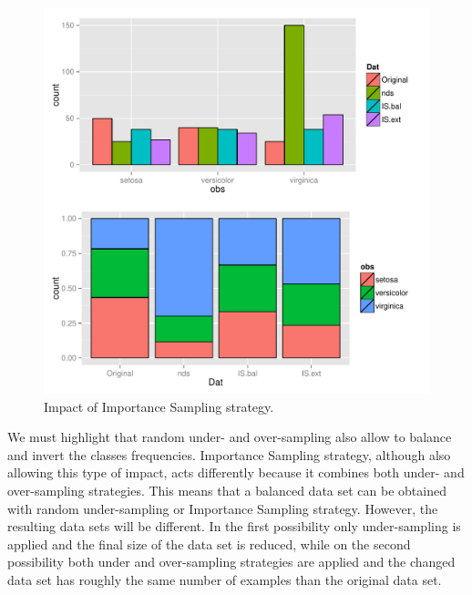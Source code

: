 \documentclass[10pt,a4paper]{article}\usepackage[]{graphicx}\usepackage[]{color}
\makeatletter
\def\maxwidth{ %
  \ifdim\Gin@nat@width>\linewidth
    \linewidth
  \else
    \Gin@nat@width
  \fi
}
\newenvironment{knitrout}{}{} %
\makeatother
\begin{document}
\begin{knitrout}\footnotesize
{}\color{fgcolor}\begin{figure}

{\centering \includegraphics[width=\maxwidth]{figures/UBL-ISC_2-1} 

}

\caption[Impact of Importance Sampling strategy]{Impact of Importance Sampling strategy.}\label{fig:ISC_2}
\end{figure}


\end{knitrout}

We must highlight that random under- and over-sampling also allow to balance and invert the classes frequencies. Importance Sampling strategy, although also allowing this type of impact, acts differently because it combines both under- and over-sampling strategies. This means that a balanced data set can be obtained with random under-sampling or Importance Sampling strategy. However, the resulting data sets will be different. In the first possibility only under-sampling is applied and the final size of the data set is reduced, while on the second possibility both under and over-sampling strategies are applied and the changed data set has roughly the same number of examples than the original data set.
\end{document}
